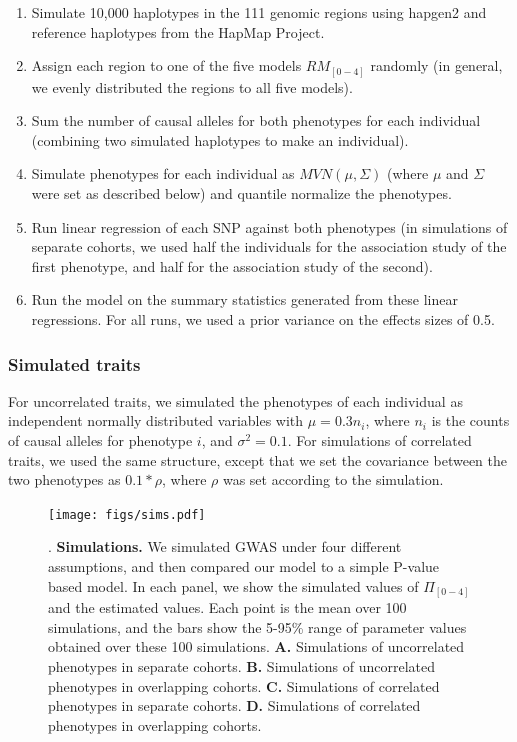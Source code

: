 \documentclass[11pt,titlepage]{article}
\begin{document}
\begin{enumerate}
\item Simulate 10,000 haplotypes in the 111 genomic regions using hapgen2 \citep{Su:2011aa} and reference haplotypes from the HapMap Project. 
\item Assign each region to one of the five models $RM_{[0-4]}$ randomly (in general, we evenly distributed the regions to all five models).
\item Sum the number of causal alleles for both phenotypes for each individual (combining two simulated haplotypes to make an individual).
\item Simulate phenotypes for each individual as $MVN(\mu, \Sigma)$ (where $\mu$ and $\Sigma$ were set as described below) and quantile normalize the phenotypes. 
\item Run linear regression of each SNP against both phenotypes (in simulations of separate cohorts, we used half the individuals for the association study of the first phenotype, and half for the association study of the second).
\item Run the model on the summary statistics generated from these linear regressions. For all runs, we used a prior variance on the effects sizes of 0.5.
\end{enumerate}

\subsubsection{Simulated traits}
For uncorrelated traits, we simulated the phenotypes of each individual as independent normally distributed variables with $\mu = 0.3 n_i$, where $n_i$ is the counts of causal alleles for phenotype $i$, and $\sigma^2 = 0.1$. For simulations of correlated traits, we used the same structure, except that we set the covariance between the two phenotypes as $0.1*\rho$, where $\rho$ was set according to the simulation.

\begin{figure}
\begin{center}
\texttt{[image: figs/sims.pdf]}
\caption{. \textbf{Simulations.} We simulated GWAS under four different assumptions, and then compared our model to a simple P-value based model. In each panel, we show the simulated values of $\Pi_{[0-4]}$ and the estimated values. Each point is the mean over 100 simulations, and the bars show the 5-95\% range of parameter values obtained over these 100 simulations. \textbf{A.} Simulations of uncorrelated phenotypes in separate cohorts. \textbf{B.} Simulations of uncorrelated phenotypes in overlapping cohorts. \textbf{C.} Simulations of correlated phenotypes in separate cohorts. \textbf{D.} Simulations of correlated phenotypes in overlapping cohorts.}\label{f_sim}
\end{center}
\end{figure}
\end{document}
